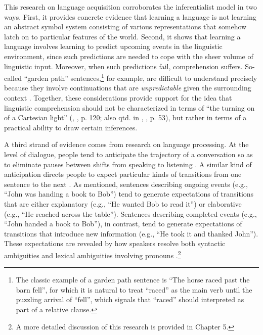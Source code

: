 This research on language acquisition corroborates the inferentialist model in two ways. First, it provides concrete evidence that learning a language is not learning an abstract symbol system consisting of various representations that somehow latch on to particular features of the world. Second, it shows that learning a language involves learning to predict upcoming events in the linguistic environment, since such predictions are needed to cope with the sheer volume of linguistic input. Moreover, when such predictions fail, comprehension suffers. So-called ``garden path'' sentences,\footnote{The classic example of a garden path sentence is ``The horse raced past the barn fell'', for which it is natural to treat ``raced'' as the main verb until the puzzling arrival of ``fell'', which signals that ``raced'' should interpreted as part of a relative clause.} for example, are difficult to understand precisely because they involve continuations that are \textit{unpredictable} given the surrounding context \citep{Christiansen:2015}. Together, these considerations provide support for the idea that linguistic comprehension should not be characterized in terms of ``the turning on of a Cartesian light'' (\citeauthor{Brandom:1994}, \citeyear{Brandom:1994}, p. 120; also qtd. in \citeauthor{Dennett:2010}, \citeyear{Dennett:2010}, p. 53), but rather in terms of a practical ability to draw certain inferences.

A third strand of evidence comes from research on language processing. At the level of dialogue, people tend to anticipate the trajectory of a conversation so as to eliminate pauses between shifts from speaking to listening \citep{Christiansen:2015,Pickering:2013}. A similar kind of anticipation directs people to expect particular kinds of transitions from one sentence to the next \citep{Rohde:2008}. As mentioned, sentences describing ongoing events (e.g., ``John was handing a book to Bob'') tend to generate expectations of transitions that are either explanatory (e.g., ``He wanted Bob to read it'') or elaborative (e.g., ``He reached across the table''). Sentences describing completed events (e.g., ``John handed a book to Bob''), in contrast, tend to generate expectations of transitions that introduce new information (e.g., ``He took it and thanked John''). These expectations are revealed by how speakers resolve both syntactic ambiguities and lexical ambiguities involving pronouns \citep{Rohde:2008}.\footnote{A more detailed discussion of this research is provided in Chapter 5.}

